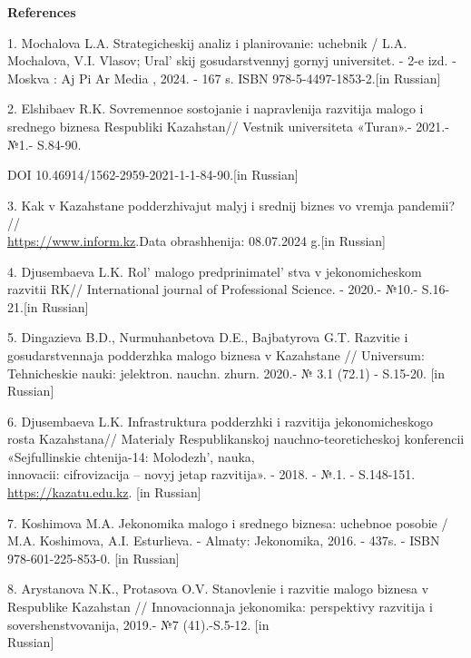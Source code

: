 \begin{center}
{\bfseries References}
\end{center}

\begin{references}
1. Mochalova L.A. Strategicheskij analiz i planirovanie: uchebnik / L.A.
Mochalova, V.I. Vlasov; Ural' skij gosudarstvennyj gornyj
universitet. - 2-e izd. - Moskva : Aj Pi Ar Media , 2024. - 167 s. ISBN
978-5-4497-1853-2.{[}in Russian{]}

2. Elshibaev R.K. Sovremennoe sostojanie i napravlenija razvitija malogo
i srednego biznesa Respubliki Kazahstan// Vestnik universiteta «Turan».-
2021.-№1.- S.84-90.

DOI 10.46914/1562-2959-2021-1-1-84-90.{[}in Russian{]}

3. Kak v Kazahstane podderzhivajut malyj i srednij biznes vo vremja
pandemii?
//\\\href{https://www.inform.kz/ru/kak-v-kazahstane-podderzhivayut-malyy-i-sredniy-biznes-vo-vremya-pandemii\_a3694302}{https://www.inform.kz}.Data
obrashhenija: 08.07.2024 g.{[}in Russian{]}

4. Djusembaeva L.K. Rol'{} malogo
predprinimatel' stva v jekonomicheskom razvitii RK//
International journal of Professional Science. - 2020.- №10.-
S.16-21.{[}in Russian{]}

5. Dingazieva B.D., Nurmuhanbetova D.E., Bajbatyrova G.T. Razvitie i
gosudarstvennaja podderzhka malogo biznesa v Kazahstane // Universum:
Tehnicheskie nauki: jelektron. nauchn. zhurn. 2020.- № 3.1 (72.1) -
S.15-20. {[}in Russian{]}

6. Djusembaeva L.K. Infrastruktura podderzhki i razvitija
jekonomicheskogo rosta Kazahstana// Materialy Respublikanskoj
nauchno-teoreticheskoj konferencii «Sejfullinskie chtenija-14:
Molodezh', nauka, \\innovacii: cifrovizacija -- novyj jetap
razvitija». - 2018. - №.1. - S.148-151.
\href{https://kazatu.edu.kz/assets/i/science/sf14\_mat\_104.pdf}{https://kazatu.edu.kz}. {[}in
Russian{]}

7. Koshimova M.A. Jekonomika malogo i srednego biznesa: uchebnoe posobie
/ M.A. Koshimova, A.I. Esturlieva. - Almaty: Jekonomika, 2016. - 437s. -
ISBN 978-601-225-853-0. {[}in Russian{]}

8. Arystanova N.K., Protasova O.V. Stanovlenie i razvitie malogo biznesa
v Respublike Kazahstan // Innovacionnaja jekonomika: perspektivy
razvitija i sovershenstvovanija, 2019.- №7 (41).-S.5-12. {[}in\\
Russian{]}


\end{references}
